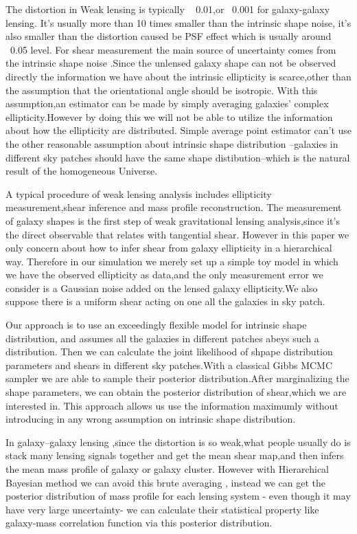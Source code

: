 \documentclass[useAMS,usenatbib]{mn2e}
\begin{document}
The distortion in Weak lensing is typically ~ 0.01,or ~0.001 for
galaxy-galaxy lensing. It's usually more than 10 times smaller than
the intrinsic shape noise, it's also smaller than the distortion caused
be PSF effect which is usually around ~0.05 level. For shear measurement
the main source of uncertainty comes from the intrinsic shape noise
.Since the unlensed galaxy shape can not be observed directly the information
we have about the intrinsic ellipticity is scarce,other than  the assumption that 
the orientational angle should be isotropic. With
this assumption,an estimator can be made by simply averaging galaxies' complex
ellipticity.However by doing this we will not be able to utilize the
information about how the ellipticity are distributed. Simple average
point estimator can't use the other reasonable assumption about intrinsic
shape distribution --galaxies in different sky patches should have
the same shape distibution--which is the natural result of the homogeneous Universe.

A typical procedure of weak lensing analysis  includes ellipticity
measurement,shear inference and mass profile reconstruction. The measurement
of galaxy shapes is the first step of weak gravitational lensing analysis,since
it's the direct observable that relates with tangential shear. However
in this paper we only concern about how to infer shear from galaxy
ellipticity in a hierarchical way. Therefore in our simulation we merely
set up a simple toy model in which we have the observed ellipticity as
data,and the only measurement error we consider is a Gaussian noise
added on the lensed galaxy ellipticity.We also suppose there is a uniform shear
acting on one all the galaxies in sky patch.

Our approach is to use an exceedingly flexible model for intrinsic
shape distribution, and assumes all the galaxies in different patches
abeys such a distribution. Then we can calculate the joint likelihood
of shpape distribution parameters and shears in different sky patches.With
a classical Gibbs MCMC sampler we are able to sample their posterior
distribution.After marginalizing the shape parameters, we can obtain
the posterior distribution of shear,which we are interested in. This
approach allows us use the information maximumly without introducing
in any wrong assumption on intrinsic shape distribution.

In galaxy--galaxy lensing ,since the distortion is so weak,what people
usually do is stack many lensing signals together and get the mean
shear map,and then infers the mean mass profile of galaxy or galaxy
cluster. However with Hierarchical Bayesian method we can avoid this brute averaging
, instead we can get the posterior distribution of mass profile for
each lensing system - even though it may have very large uncertainty- we
can calculate their statistical property like galaxy-mass correlation
function via this posterior distribution.
\end{document}
